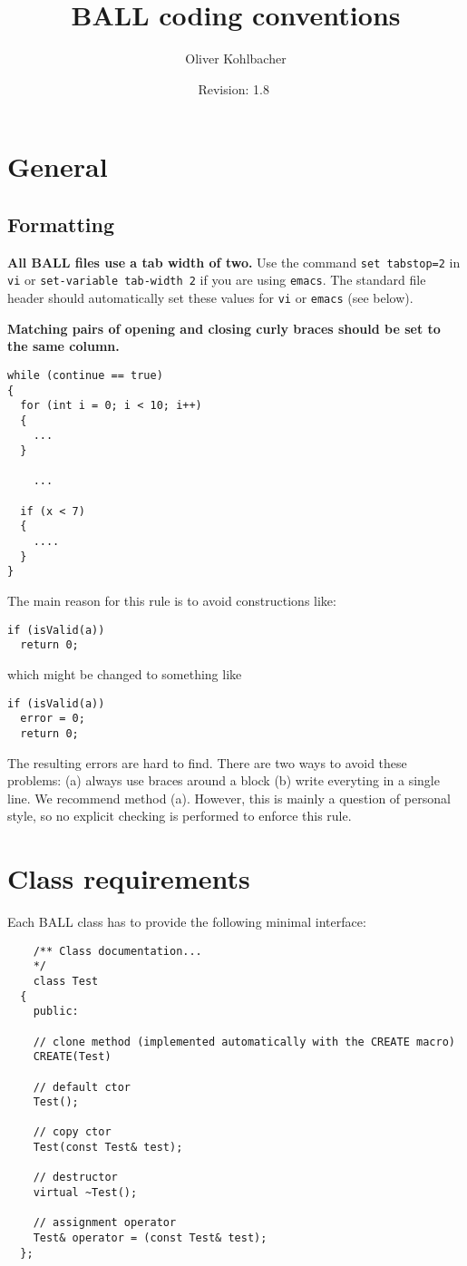 \documentclass[a4paper,10pt]{article}
\title{BALL coding conventions}
\author{Oliver Kohlbacher}
\date{$ $Revision: 1.8 $ $}
\begin{document}
\maketitle

\section{General}

\subsection{Formatting}

{\bf All BALL files use a tab width of two.} Use the command {\tt set tabstop=2} in
{\tt vi} or {\tt set-variable tab-width 2} if you are using {\tt emacs}. The
standard file header should automatically set these values for {\tt vi} or
{\tt emacs} (see below).

\noindent
{\bf Matching pairs of opening and closing curly braces should be set to the same
column.}

\begin{verbatim}
while (continue == true)
{
  for (int i = 0; i < 10; i++)
  {
    ...
  }

 	...

  if (x < 7)
  {
    ....
  }
}
\end{verbatim}
The main reason for this rule is to avoid constructions like:

\begin{verbatim}
if (isValid(a))
  return 0;
\end{verbatim}

\noindent
which might be changed to something like

\begin{verbatim}
if (isValid(a))
  error = 0;
  return 0;
\end{verbatim}

The resulting errors are hard to find. There are two ways to avoid these
problems: (a) always use braces around a block (b) write everyting in a single
line. We recommend method (a).
However, this is mainly a question of personal style, so no explicit checking
is performed to enforce this rule.



\section{Class requirements}

Each BALL class has to provide the following minimal interface:
\begin{verbatim}
	/** Class documentation... 
	*/
	class Test
  {
    public:

    // clone method (implemented automatically with the CREATE macro)
    CREATE(Test)    

    // default ctor
    Test();

    // copy ctor 
    Test(const Test& test);

    // destructor 
    virtual ~Test();
 
    // assignment operator
    Test& operator = (const Test& test);
  };
\end{verbatim}
\end{document}
